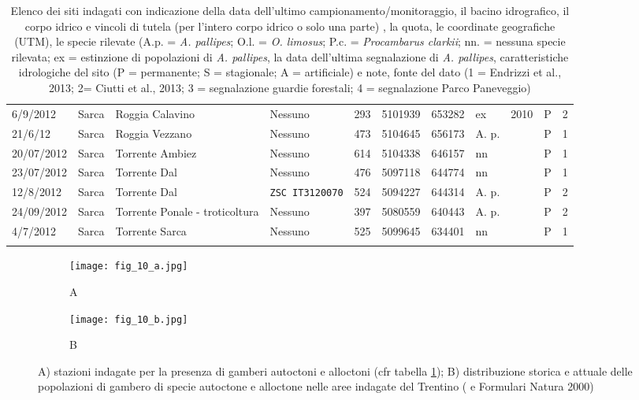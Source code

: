 \documentclass[11pt,a4paper,italian,twoside,openany]{memoir}
\begin{document}
\begin{longtable}[c]{p{}p{}p{}p{}p{}p{}p{}p{}p{}p{}l}
6/9/2012  & Sarca  & Roggia Calavino & Nessuno & 293 & 5101939  & 653282 & ex   & 2010  & P & 2   \\
\rowcolor[HTML]{EFEFEF} 21/6/12   & Sarca  & Roggia Vezzano & Nessuno & 473 & 5104645  & 656173 & A. p.  &   & P & 1   \\
20/07/2012 & Sarca  & Torrente Ambiez & Nessuno & 614 & 5104338  & 646157 & nn   &   & P & 1   \\
\rowcolor[HTML]{EFEFEF} 23/07/2012 & Sarca  & Torrente Dal   & Nessuno & 476 & 5097118  & 644774 & nn   &   & P & 1   \\
12/8/2012 & Sarca  & Torrente Dal   & \texttt{ZSC IT3120070}  & 524 & 5094227  & 644314 & A. p.  &   & P & 2   \\
\rowcolor[HTML]{EFEFEF} 24/09/2012 & Sarca  & Torrente Ponale - troticoltura   & Nessuno & 397 & 5080559  & 640443 & A. p.  &   & P & 2   \\
4/7/2012  & Sarca  & Torrente Sarca & Nessuno & 525 & 5099645  & 634401 & nn   &   & P & 1   \\* \bottomrule
\caption{Elenco dei siti indagati con indicazione della data dell'ultimo campionamento/monitoraggio, il bacino idrografico, il corpo idrico e vincoli di tutela (per l'intero corpo idrico o solo una parte) , la quota, le coordinate geografiche (UTM), le specie rilevate (A.p. = \emph{A. pallipes}; O.l. = \emph{O. limosus}; P.c. = \emph{Procambarus clarkii}; nn. = nessuna specie rilevata; ex = estinzione di popolazioni di \emph{A. pallipes}, la data dell'ultima segnalazione di \emph{A. pallipes}, caratteristiche idrologiche del sito (P = permanente; S = stagionale; A = artificiale) e note, fonte del dato (1 = Endrizzi et al., 2013; 2= Ciutti et al., 2013; 3 = segnalazione guardie forestali; 4 = segnalazione Parco Paneveggio)}
\label{tab_4}\\
\end{longtable}
\normalsize

\begin{figure}
  \centering
  \begin{subfigure}[t]{.8\textwidth}
    \centering
    \texttt{[image: fig\_10\_a.jpg]}
    \caption{A}
    \label{fig_10a}
  \end{subfigure}
  \begin{subfigure}[t]{.8\textwidth}
    \centering
    \texttt{[image: fig\_10\_b.jpg]}
    \caption{B}
    \label{fig_10b}
  \end{subfigure}  
  \caption{A) stazioni indagate per la presenza di gamberi autoctoni e alloctoni (cfr tabella \ref{tab_4}); B) distribuzione storica e attuale delle popolazioni di gambero di specie autoctone e alloctone nelle aree indagate del Trentino (\cite{Paoli 2008} \cite{Ciutti 2013} \cite{Endrizzi 2013} e Formulari Natura 2000)}
  \label{fig_10}
\end{figure}
\end{document}
